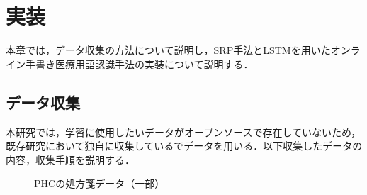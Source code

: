 
\chapter{実装}
\label{cha:imple}
本章では，データ収集の方法について説明し，SRP手法とLSTMを用いたオンライン手書き医療用語認識手法の実装について説明する．
\section{データ収集}
\label{sec:collection}
本研究では，学習に使用したいデータがオープンソースで存在していないため，既存研究において独自に収集しているでデータを用いる．以下収集したデータの内容，収集手順を説明する．

\begin{figure}[tb]
 \begin{center}
  \caption{PHCの処方箋データ（一部）}
  \label{corpus}
\end{center}
\end{figure}

